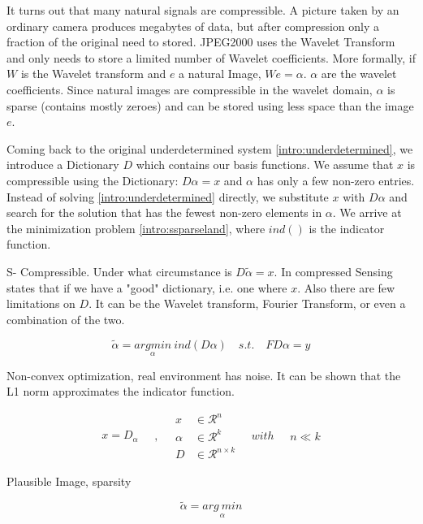 It turns out that many natural signals are compressible. A picture taken by an ordinary camera produces megabytes of data, but after compression only a fraction of the original need to stored. JPEG2000 uses the Wavelet Transform and only needs to store a limited number of Wavelet coefficients. More formally, if $W$ is the Wavelet transform and $e$ a natural Image, $We = \alpha$. $\alpha$ are the wavelet coefficients. Since natural images are compressible in the wavelet domain, $\alpha$ is sparse (contains mostly zeroes) and can be stored using less space than the image $e$.

Coming back to the original underdetermined system \eqref{intro:underdetermined}, we introduce a Dictionary $D$ which contains our basis functions. We assume that $x$ is compressible using the Dictionary: $D\alpha = x$ and $\alpha$ has only a few non-zero entries. Instead of solving \eqref{intro:underdetermined} directly, we substitute $x$ with $D\alpha$ and search for the solution that has the fewest non-zero elements in $\alpha$. We arrive at the minimization problem \eqref{intro:ssparseland}, where $\mathit{ind}()$ is the indicator function. 

S- Compressible. Under what circumstance is $D\tilde{\alpha} = x$. In compressed Sensing states that if we have a "good" dictionary, i.e. one where $x$. Also there are few limitations on $D$. It can be the Wavelet transform, Fourier Transform, or even a combination of the two.

\begin{equation}\label{intro:ssparseland}
\tilde{\alpha} =  \underset{\alpha}{arg min} \: \mathit{ind}(D\alpha) \quad s. t. \quad FD\alpha = y
\end{equation}

Non-convex optimization, real environment has noise. It can be shown that the L1 norm approximates the indicator function.


\begin{equation}\label{intro:sparseland}
\begin{split}
x  =  D_{\alpha}
\end{split}
\quad , \quad
\begin{split}
x &\in \mathcal{R}^n\\
\alpha &\in \mathcal{R}^k\\
D &\in \mathcal{R}^{n \times k}
\end{split}
\quad with \quad
\begin{split}
n \ll k
\end{split}
\end{equation}

Plausible Image, sparsity

\begin{equation}\label{cs:noiseless}
\tilde{\alpha} =  \underset{\alpha}{arg\: min}
\end{equation}

